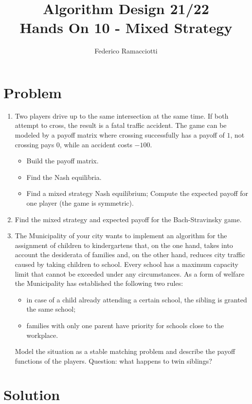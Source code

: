 \documentclass{article}
\title{\LARGE{\textbf{Algorithm Design 21/22}}\\ \vspace{1cm} Hands On 10 - Mixed Strategy}
\author{Federico Ramacciotti}
\date{}
\begin{document}
\maketitle

\section{Problem}
\begin{enumerate}
    \item Two players drive up to the same intersection at the same time. If both attempt to cross, the result is a fatal traffic accident. The game can be modeled by a payoff matrix where crossing successfully has a payoff of $1$, not crossing pays $0$, while an accident costs $-100$.
    \begin{itemize}
        \item Build the payoff matrix.
        \item Find the Nash equilibria.
        \item Find a mixed strategy Nash equilibrium; Compute the expected payoff for one player (the game is symmetric).
    \end{itemize}
    \item Find the mixed strategy and expected payoff for the Bach-Stravinsky game.
    \item The Municipality of your city wants to implement an algorithm for the assignment of children to kindergartens that, on the one hand, takes into account the desiderata of families and, on the other hand, reduces city traffic caused by taking children to school. Every school has a maximum capacity limit that cannot be exceeded under any circumstances. As a form of welfare the Municipality has established the following two rules:
    \begin{itemize}
        \item in case of a child already attending a certain school, the sibling is granted the same school;
        \item families with only one parent have priority for schools close to the workplace.
    \end{itemize}
    Model the situation as a stable matching problem and describe the payoff functions of the players. Question: what happens to twin siblings?
\end{enumerate}

\section{Solution}
\end{document}

